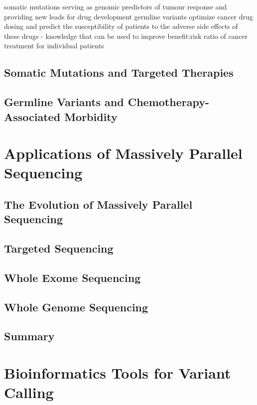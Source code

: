 somatic mutations serving as genomic predictors of tumour response and providing new leads for drug development
germline variants optimize cancer drug dosing and predict the susceptibility of patients to the adverse side effects of these drugs - knowledge that can be used to improve benefit:risk ratio of cancer treatment for individual patients

\subsection{Somatic Mutations and Targeted Therapies}


\subsection{Germline Variants and Chemotherapy-Associated Morbidity}

\section{Applications of Massively Parallel Sequencing}
\label{sec:ApplicationsofMassivelyParallelSequencing}

\subsection{The Evolution of Massively Parallel Sequencing}

\subsection{Targeted Sequencing}

\subsection{Whole Exome Sequencing}

\subsection{Whole Genome Sequencing}

\subsection{Summary}

\section{Bioinformatics Tools for Variant Calling}
\label{sec:BioinformaticsToolsforVariantCalling}

